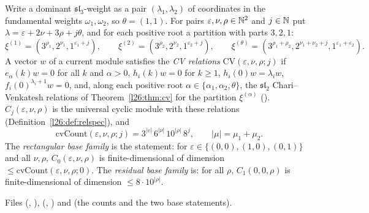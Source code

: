 \begin{definition}\label{l26:def:cvfamily}
Write a dominant $\mathfrak{sl}_3$-weight as a pair $(\lambda_1,\lambda_2)$ of coordinates in the fundamental weights
$\omega_1,\omega_2$, so $\theta=(1,1)$. For pairs $\varepsilon,\nu,\rho\in{\mathbb{N}}^2$ and $j\in{\mathbb{N}}$ put
$\lambda=\varepsilon+2\nu+3\rho+j\theta$, and for each positive root a partition with parts $3,2,1$:
\begin{equation*}
\xi^{(1)}=(3^{\rho_1},2^{\nu_1},1^{\varepsilon_1+j}),\qquad \xi^{(2)}=(3^{\rho_2},2^{\nu_2},1^{\varepsilon_2+j}),\qquad
\xi^{(\theta)}=(3^{\rho_1+\rho_2},2^{\nu_1+\nu_2+j},1^{\varepsilon_1+\varepsilon_2}) .
\end{equation*}
A vector $w$ of a current module satisfies the \emph{CV relations} $\mathrm{CV}(\varepsilon,\nu,\rho;j)$ if $e_\alpha(k)w=0$ for all
$k$ and $\alpha>0$, $h_i(k)w=0$ for $k\ge1$, $h_i(0)w=\lambda_iw$, $f_i(0)^{\lambda_i+1}w=0$, and, along each positive root
$\alpha\in\{\alpha_1,\alpha_2,\theta\}$, the $\mathfrak{sl}_2$ Chari--Venkatesh relations of Theorem~\ref{l26:thm:cv} for the
partition $\xi^{(\alpha)}$ (). $C_j(\varepsilon,\nu,\rho)$ is the universal cyclic module with these relations
(Definition~\ref{l26:def:relspec}), and
\begin{equation*}
\mathrm{cvCount}(\varepsilon,\nu,\rho;j)=3^{|\varepsilon|}\,6^{|\nu|}\,10^{|\rho|}\,8^{j},\qquad |\mu|=\mu_1+\mu_2 .
\end{equation*}
The \emph{rectangular base family} is the statement: for $\varepsilon\in\{(0,0),(1,0),(0,1)\}$ and all $\nu,\rho$,
$C_0(\varepsilon,\nu,\rho)$ is finite-dimensional of dimension $\le\mathrm{cvCount}(\varepsilon,\nu,\rho;0)$. The \emph{residual
base family} is: for all $\rho$, $C_1(0,0,\rho)$ is finite-dimensional of dimension $\le8\cdot10^{|\rho|}$.
\end{definition}
\noindent Files  (, ),
 (, ) and
 (the counts and the two base statements).
